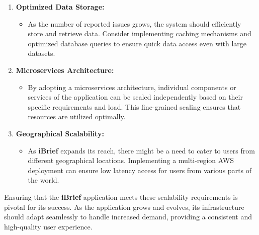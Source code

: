 \begin{enumerate}
    \item \textbf{Optimized Data Storage:}
    \begin{itemize}
        \item As the number of reported issues grows, the system should efficiently store and retrieve data. Consider implementing caching mechanisms and optimized database queries to ensure quick data access even with large datasets.
    \end{itemize}
    
    \item \textbf{\gls{Microservices} Architecture:}
    \begin{itemize}
        \item By adopting a microservices architecture, individual components or services of the application can be scaled independently based on their specific requirements and load. This fine-grained scaling ensures that resources are utilized optimally.
    \end{itemize}
    
    \item \textbf{Geographical Scalability:}
    \begin{itemize}
        \item As \textbf{iBrief} expands its reach, there might be a need to cater to users from different geographical locations. Implementing a multi-region AWS deployment can ensure low latency access for users from various parts of the world.
    \end{itemize}
\end{enumerate}

Ensuring that the \textbf{iBrief} application meets these scalability requirements is pivotal for its success. As the application grows and evolves, its infrastructure should adapt seamlessly to handle increased demand, providing a consistent and high-quality user experience.
